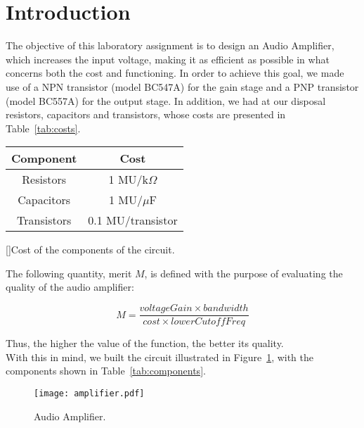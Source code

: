 \section{Introduction}
\label{sec:introduction}

The objective of this laboratory assignment is to design an Audio Amplifier, which increases the input voltage, making it as efficient as possible in what concerns both the cost and functioning. In order to achieve this goal, we made use of a NPN transistor (model BC547A) for the gain stage and a PNP transistor (model BC557A) for the output stage. In addition, we had at our disposal resistors, capacitors and transistors, whose costs are presented in Table~\ref{tab:costs}.

\begin{center}
\begin{tabular}{ | c | c | }
\hline
\textbf{Component} & \textbf{Cost} \\
\hline
Resistors & 1 MU/k$\Omega$ \\  
Capacitors & 1 MU/$\mu$F \\
Transistors & 0.1 MU/transistor \\
\hline   
\end{tabular}\label{tab:costs}
[]{Cost of the components of the circuit.}
\end{center}

The following quantity, merit $M$, is defined with the purpose of evaluating the quality of the audio amplifier:

\begin{equation}
  M = \frac{voltageGain \times bandwidth}{cost \times lowerCutoffFreq}
\end{equation}

Thus, the higher the value of the function, the better its quality.\\

With this in mind, we built the circuit illustrated in Figure~\ref{fig:amplifier}, with the components shown in Table~\ref{tab:components}.

\begin{figure}[H] \centering
\texttt{[image: amplifier.pdf]}
\caption{Audio Amplifier.}
\label{fig:amplifier}
\end{figure}

